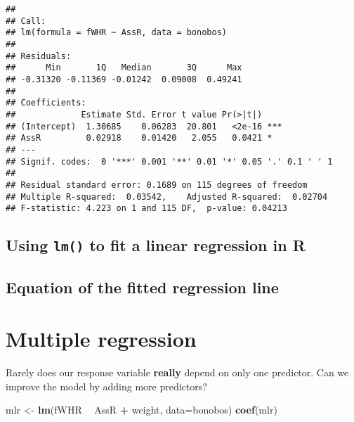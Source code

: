 \documentclass[]{book}
\newenvironment{Shaded}{\begin{snugshade}}{\end{snugshade}}
\newcommand{\DataTypeTok}[1]{\textcolor[rgb]{0.13,0.29,0.53}{#1}}
\newcommand{\KeywordTok}[1]{\textcolor[rgb]{0.13,0.29,0.53}{\textbf{#1}}}
\newcommand{\NormalTok}[1]{#1}
\newcommand{\OperatorTok}[1]{\textcolor[rgb]{0.81,0.36,0.00}{\textbf{#1}}}
\newcommand{\StringTok}[1]{\textcolor[rgb]{0.31,0.60,0.02}{#1}}
\begin{document}
\begin{verbatim}
## 
## Call:
## lm(formula = fWHR ~ AssR, data = bonobos)
## 
## Residuals:
##      Min       1Q   Median       3Q      Max 
## -0.31320 -0.11369 -0.01242  0.09008  0.49241 
## 
## Coefficients:
##             Estimate Std. Error t value Pr(>|t|)    
## (Intercept)  1.30685    0.06283  20.801   <2e-16 ***
## AssR         0.02918    0.01420   2.055   0.0421 *  
## ---
## Signif. codes:  0 '***' 0.001 '**' 0.01 '*' 0.05 '.' 0.1 ' ' 1
## 
## Residual standard error: 0.1689 on 115 degrees of freedom
## Multiple R-squared:  0.03542,    Adjusted R-squared:  0.02704 
## F-statistic: 4.223 on 1 and 115 DF,  p-value: 0.04213
\end{verbatim}

\hypertarget{using-lm-to-fit-a-linear-regression-in-r}{%
\subsection{\texorpdfstring{Using \texttt{lm()} to fit a linear regression in R}{Using lm() to fit a linear regression in R}}\label{using-lm-to-fit-a-linear-regression-in-r}}

\vspace{1.5in}

\hypertarget{equation-of-the-fitted-regression-line}{%
\subsection{Equation of the fitted regression line}\label{equation-of-the-fitted-regression-line}}

\vspace{1.5in}

\hypertarget{multiple-regression}{%
\section{Multiple regression}\label{multiple-regression}}

Rarely does our response variable \textbf{really} depend on only one predictor. Can we improve the model by adding more predictors?

\begin{Shaded}
\begin{Highlighting}[]
\NormalTok{mlr <-}\StringTok{ }\KeywordTok{lm}\NormalTok{(fWHR }\OperatorTok{~}\StringTok{ }\NormalTok{AssR }\OperatorTok{+}\StringTok{ }\NormalTok{weight, }\DataTypeTok{data=}\NormalTok{bonobos)}
\KeywordTok{coef}\NormalTok{(mlr)}
\end{Highlighting}
\end{Shaded}
\end{document}
